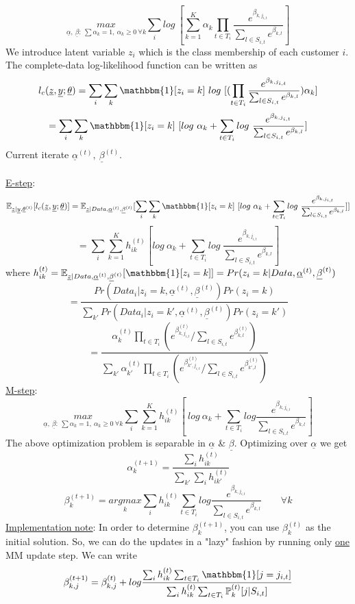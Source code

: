 \documentclass[11pt]{article}
\begin{document}
$$\underset{\underline{\alpha},\ \underline{\beta}:\ \sum \alpha_k=1,\ \alpha_k \geq 0\ \forall k}{max}\sum_ilog\ [\sum_{k=1}^K\alpha_k\prod_{t\in T_i}\frac{e^{\beta_{k,j_{i,t}}}}{\sum_{l\in S_{i,t}}e^{\beta_{k,l}}}]$$
We introduce latent variable $z_i$ which is the class membership of each customer $i$. The complete-data log-likelihood function can be written as
$$l_c(\underline{z},\underline{y};\underline{\theta})=\sum_i\sum_k\mathbbm{1}[z_i=k]\ log\ [(\prod_{t\in T_i}\frac{e^{\beta_{k,j_{i,t}}}}{\sum_{l\in S_{i,t}}e^{\beta_{k,l}}})\alpha_k]$$
$$=\sum_i\sum_k\mathbbm{1}[z_i=k]\ [log\ \alpha_k+\sum_{t\in T_i}log\ \frac{e^{\beta_{k,j_{i,t}}}}{\sum_{l\in S_{i,t}}e^{\beta_{k,l}}}]$$
Current iterate $\underline{\alpha}^{(t)},\ \underline{\beta}^{(t)}$.\\~\\
\underline{E-step}:
$$\mathbb{E}_{\underline{z}|\underline{y},\underline{\theta}^{(t)}}[l_c(\underline{z},\underline{y};\underline{\theta})]=\mathbb{E}_{\underline{z}|Data,\underline{\alpha}^{(t)},\underline{\beta}^{(t)}}[\sum_i\sum_k\mathbbm{1}[z_i=k]\ [log\ \alpha_k+\sum_{t\in T_i}log\ \frac{e^{\beta_{k,j_{i,t}}}}{\sum_{l\in S_{i,t}}e^{\beta_{k,l}}}]]$$
$$=\sum_i\sum_{k=1}^K h_{ik}^{(t)}[log\ \alpha_k+\sum_{t\in T_i}log\ \frac{e^{\beta_{k,j_{i,t}}}}{\sum_{l\in S_{i,t}}e^{\beta_{k,l}}}]$$
where $h_{ik}^{(t)} = \mathbb{E}_{\underline{z}|Data,\underline{\alpha}^{(t)},\underline{\beta}^{(t)}}[\mathbbm{1}[z_i=k]]=Pr(z_i=k|Data,\underline{\alpha}^{(t)},\underline{\beta}^{(t)})$
$$=\frac{Pr(Data_i|z_i=k,\underline{\alpha}^{(t)},\underline{\beta}^{(t)})Pr(z_i=k)}{\sum_{k'}Pr(Data_i|z_i=k',\underline{\alpha}^{(t)},\underline{\beta}^{(t)})Pr(z_i=k')}$$
$$=\frac{\alpha_k^{(t)}\prod_{t\in T_i}(e^{\beta_{k,j_{i,t}}^{(t)}}/ \sum_{l\in S_{i,t}}e^{\beta_{k,l}^{(t)}})}{\sum_{k'}\alpha_{k'}^{(t)}\prod_{t\in T_i}(e^{\beta_{k',j_{i,t}}^{(t)}}/ \sum_{l\in S_{i,t}}e^{\beta_{k',l}^{(t)}})}$$
\underline{M-step}:
$$\underset{\underline{\alpha},\ \underline{\beta}:\ \sum \alpha_k=1,\ \alpha_k \geq 0\ \forall k}{max}\sum_i\sum_{k=1}^K h_{ik}^{(t)}[\ log\ \alpha_k+\sum_{t\in T_i}log\frac{e^{\beta_{k,j_{i,t}}}}{\sum_{l\in S_{i,t}}e^{\beta_{k,l}}}]$$
The above optimization problem is separable in $\underline{\alpha}$ \& $\underline{\beta}$. Optimizing over $\underline{\alpha}$ we get
$$\alpha_k^{(t+1)} = \frac{\sum_i h_{ik}^{(t)}}{\sum_{k'}\sum_i h_{ik'}^{(t)}}$$
$$\beta_k^{(t+1)} = \underset{k}{argmax}\sum_i h_{ik}^{(t)} \sum_{t\in T_i} log\frac{e^{\beta_{k,j_{i,t}}}}{\sum_{l\in S_{i,t}}e^{\beta_{k,l}}}\qquad \forall k$$
\underline{Implementation note}: In order to determine $\beta_k^{(t+1)}$, you can use $\beta_k^{(t)}$ as the initial solution. So, we can do the updates in a "lazy" fashion by running only \underline{one} MM update step. We can write $$\beta_{k,j}^{(t+1)} = \beta_{k,j}^{(t)} + log \frac{\sum_i h_{ik}^{(t)}\sum_{t\in T_i} \mathbbm{1}[j=j_{i,t}]}{\sum_i h_{ik}^{(t)}\sum_{t\in T_i} \mathbb{P}_k^{(t)}[j|S_{i,t}]}$$\\~\\
\end{document}
